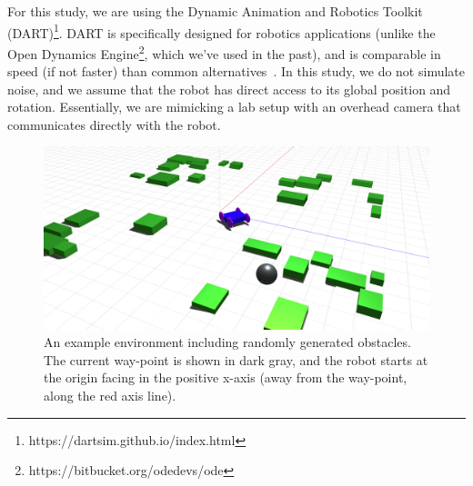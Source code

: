 For this study, we are using the Dynamic Animation and Robotics Toolkit (DART)\footnote{https://dartsim.github.io/index.html}.
%
DART is specifically designed for robotics applications (unlike the Open Dynamics Engine\footnote{https://bitbucket.org/odedevs/ode}, which we've used in the past), and is comparable in speed (if not faster) than common alternatives~\autocite{Mouret.2017.SimER.Simulation}.
%
In this study, we do not simulate noise, and we assume that the robot has direct access to its global position and rotation. Essentially, we are mimicking a lab setup with an overhead camera that communicates directly with the robot.


\begin{figure}[!ht]
    \centering

    \includegraphics[width=0.8\columnwidth]{figures/3-adabot/environment.png}

    \vspace{-0.1in}

    \caption{An example environment including randomly generated obstacles. The current way-point is shown in dark gray, and the robot starts at the origin facing in the positive x-axis (away from the way-point, along the red axis line).}
    \label{fig:simulation-environment}

    \vspace{-0.2in}

\end{figure}

